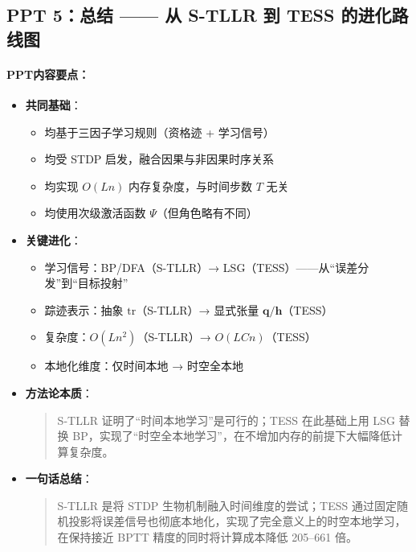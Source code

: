 \documentclass[journal,12pt,onecolumn]{IEEEtran}
\begin{document}
\subsection*{PPT 5：总结 —— 从 S-TLLR 到 TESS 的进化路线图}

\paragraph{\textbf{PPT内容要点：}}
\begin{itemize}
    \item \textbf{共同基础}：
    \begin{itemize}
        \item 均基于三因子学习规则（资格迹 + 学习信号）
        \item 均受 STDP 启发，融合因果与非因果时序关系
        \item 均实现 \(O(Ln)\) 内存复杂度，与时间步数 \(T\) 无关
        \item 均使用次级激活函数 \(\Psi\)（但角色略有不同）
    \end{itemize}
    
    \item \textbf{关键进化}：
    \begin{itemize}
        \item 学习信号：BP/DFA（S-TLLR）→ LSG（TESS）——从“误差分发”到“目标投射”
        \item 踪迹表示：抽象 \(\text{tr}\)（S-TLLR）→ 显式张量 \(\mathbf{q}/\mathbf{h}\)（TESS）
        \item 复杂度：\(O(Ln^2)\)（S-TLLR）→ \(O(LCn)\)（TESS）
        \item 本地化维度：仅时间本地 → 时空全本地
    \end{itemize}
    
    \item \textbf{方法论本质}：
    \begin{quote}
        S-TLLR 证明了“时间本地学习”是可行的；TESS 在此基础上用 LSG 替换 BP，实现了“时空全本地学习”，在不增加内存的前提下大幅降低计算复杂度。
    \end{quote}
    
    \item \textbf{一句话总结}：
    \begin{quote}
        S-TLLR 是将 STDP 生物机制融入时间维度的尝试；TESS 通过固定随机投影将误差信号也彻底本地化，实现了完全意义上的时空本地学习，在保持接近 BPTT 精度的同时将计算成本降低 205–661 倍。
    \end{quote}
\end{itemize}
\end{document}
